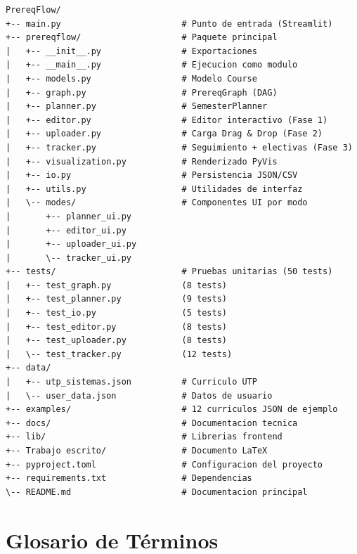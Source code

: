 \documentclass[12pt]{report}
\begin{document}
\begin{verbatim}
PrereqFlow/
+-- main.py                        # Punto de entrada (Streamlit)
+-- prereqflow/                    # Paquete principal
|   +-- __init__.py                # Exportaciones
|   +-- __main__.py                # Ejecucion como modulo
|   +-- models.py                  # Modelo Course
|   +-- graph.py                   # PrereqGraph (DAG)
|   +-- planner.py                 # SemesterPlanner
|   +-- editor.py                  # Editor interactivo (Fase 1)
|   +-- uploader.py                # Carga Drag & Drop (Fase 2)
|   +-- tracker.py                 # Seguimiento + electivas (Fase 3)
|   +-- visualization.py           # Renderizado PyVis
|   +-- io.py                      # Persistencia JSON/CSV
|   +-- utils.py                   # Utilidades de interfaz
|   \-- modes/                     # Componentes UI por modo
|       +-- planner_ui.py
|       +-- editor_ui.py
|       +-- uploader_ui.py
|       \-- tracker_ui.py
+-- tests/                         # Pruebas unitarias (50 tests)
|   +-- test_graph.py              (8 tests)
|   +-- test_planner.py            (9 tests)
|   +-- test_io.py                 (5 tests)
|   +-- test_editor.py             (8 tests)
|   +-- test_uploader.py           (8 tests)
|   \-- test_tracker.py            (12 tests)
+-- data/
|   +-- utp_sistemas.json          # Curriculo UTP
|   \-- user_data.json             # Datos de usuario
+-- examples/                      # 12 curriculos JSON de ejemplo
+-- docs/                          # Documentacion tecnica
+-- lib/                           # Librerias frontend
+-- Trabajo escrito/               # Documento LaTeX
+-- pyproject.toml                 # Configuracion del proyecto
+-- requirements.txt               # Dependencias
\-- README.md                      # Documentacion principal
\end{verbatim}

\section{Glosario de Términos}
\end{document}
